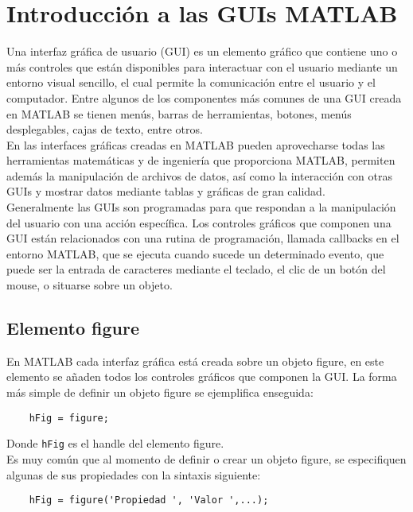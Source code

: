 \chapter{Introducción a las GUIs MATLAB}

Una interfaz gráfica de usuario (GUI) es un elemento gráfico que contiene uno o más controles que están disponibles 
para interactuar con el usuario mediante un entorno visual sencillo, el cual permite la comunicación entre el usuario 
y el computador. Entre algunos de los componentes más comunes de una GUI creada en MATLAB se tienen menús, barras de 
herramientas, botones, menús desplegables, cajas de texto, entre otros.\\

En las interfaces gráficas creadas en MATLAB pueden aprovecharse todas las herramientas matemáticas y de ingeniería 
que proporciona MATLAB, permiten además la manipulación de archivos de datos, así como la interacción con otras GUIs 
y mostrar datos mediante tablas y gráficas de gran calidad.\\

Generalmente las GUIs son programadas para que respondan a la manipulación del usuario con una acción específica. 
Los controles gráficos que componen una GUI están relacionados con una rutina de programación, llamada callbacks 
en el entorno MATLAB, que se ejecuta cuando sucede  un determinado evento, que puede ser la entrada de caracteres 
mediante el teclado, el clic de un botón del mouse, o situarse sobre un objeto.

\section{Elemento figure}

En MATLAB cada interfaz gráfica está creada sobre un objeto figure, en este elemento se añaden 
todos los controles gráficos que componen la GUI. La forma más simple de definir un objeto 
figure se ejemplifica enseguida:

\begin{verbatim}
	hFig = figure;
\end{verbatim}

Donde \texttt{hFig} es el handle del elemento figure.\\

Es muy común que al momento de definir o crear un objeto figure, se especifiquen algunas 
de sus propiedades con la sintaxis siguiente:

\begin{verbatim}
	hFig = figure('Propiedad ', 'Valor ',...);
\end{verbatim}

